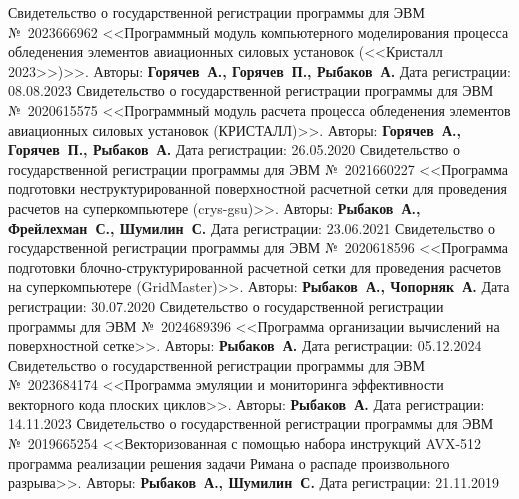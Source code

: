 \begin{thebibliography}{99}
%
Свидетельство о государственной регистрации программы для ЭВМ №~2023666962 <<Программный модуль компьютерного моделирования процесса обледенения элементов авиационных силовых установок (<<Кристалл 2023>>)>>. Авторы: \textbf{Горячев~А., Горячев~П., Рыбаков~А.} Дата регистрации: 08.08.2023
%
Свидетельство о государственной регистрации программы для ЭВМ №~2020615575 <<Программный модуль расчета процесса обледенения элементов авиационных силовых установок (КРИСТАЛЛ)>>. Авторы: \textbf{Горячев~А., Горячев~П., Рыбаков~А.} Дата регистрации: 26.05.2020
%
Свидетельство о государственной регистрации программы для ЭВМ №~2021660227 <<Программа подготовки неструктурированной поверхностной расчетной сетки для проведения расчетов на суперкомпьютере (crys-gsu)>>. Авторы: \textbf{Рыбаков~А., Фрейлехман~С., Шумилин~С.} Дата регистрации: 23.06.2021
%
Свидетельство о государственной регистрации программы для ЭВМ №~2020618596 <<Программа подготовки блочно-структурированной расчетной сетки для проведения расчетов на суперкомпьютере (GridMaster)>>. Авторы: \textbf{Рыбаков~А., Чопорняк~А.} Дата регистрации: 30.07.2020
%
Свидетельство о государственной регистрации программы для ЭВМ №~2024689396 <<Программа организации вычислений на поверхностной сетке>>. Авторы: \textbf{Рыбаков~А.} Дата регистрации: 05.12.2024
%
Свидетельство о государственной регистрации программы для ЭВМ №~2023684174 <<Программа эмуляции и мониторинга эффективности векторного кода плоских циклов>>. Авторы: \textbf{Рыбаков~А.} Дата регистрации: 14.11.2023
%
Свидетельство о государственной регистрации программы для ЭВМ №~2019665254 <<Векторизованная с помощью набора инструкций AVX-512 программа реализации решения задачи Римана о распаде произвольного разрыва>>. Авторы: \textbf{Рыбаков~А., Шумилин~С.} Дата регистрации: 21.11.2019
%






%
%







\end{thebibliography}
